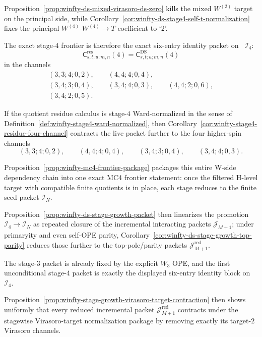 \begin{remark}
Proposition~\ref{prop:winfty-ds-mixed-virasoro-ds-zero} kills the mixed
$W^{(2)}$ target on the principal side, while
Corollary~\ref{cor:winfty-ds-stage4-self-t-normalization} fixes the
principal $W^{(4)}$-$W^{(4)}\to T$ coefficient to `2'.

The exact stage-$4$ frontier is therefore the exact six-entry identity
packet on
~$\mathcal{I}_4$:
\[
\mathsf{C}^{\mathrm{res}}_{s,t;u;m,n}(4)
=
\mathsf{C}^{\mathrm{DS}}_{s,t;u;m,n}(4)
\]
in the channels
\[
\begin{gathered}
(3,3;4;0,2),\qquad
(4,4;4;0,4),\\
(3,4;3;0,4),\qquad
(3,4;4;0,3),\qquad
(4,4;2;0,6),\\
(3,4;2;0,5).
\end{gathered}
\]

If the quotient residue calculus is stage-$4$ Ward-normalized in the
sense of Definition~\ref{def:winfty-stage4-ward-normalized}, then
Corollary~\ref{cor:winfty-stage4-residue-four-channel} contracts the
live packet further to the four higher-spin channels
\[
(3,3;4;0,2),\qquad
(4,4;4;0,4),\qquad
(3,4;3;0,4),\qquad
(3,4;4;0,3).
\]

Proposition~\ref{prop:winfty-mc4-frontier-package} packages this
entire W-side dependency chain into one exact MC4 frontier statement:
once the filtered H-level target with compatible finite quotients is in
place, each stage reduces to the finite seed packet
$\mathcal{I}_N$.

Proposition~\ref{prop:winfty-ds-stage-growth-packet} then
linearizes the promotion $\mathcal{I}_4\to \mathcal{I}_N$ as repeated
closure of the incremental interacting packets
$\mathcal{J}_{M+1}$; under primaryity and even self-OPE parity,
Corollary~\ref{cor:winfty-ds-stage-growth-top-parity} reduces those
further to the top-pole/parity packets
$\mathcal{J}_{M+1}^{\mathrm{red}}$.

The stage-$3$ packet is already fixed by the explicit $W_3$ OPE, and
the first unconditional stage-$4$ packet is exactly the displayed
six-entry identity block on~$\mathcal{I}_4$.

Proposition~\ref{prop:winfty-stage-growth-virasoro-target-contraction}
then shows uniformly that every reduced incremental packet
$\mathcal{J}_{M+1}^{\mathrm{red}}$ contracts under the stagewise
Virasoro-target normalization package by removing exactly its
target-$2$ Virasoro channels.


\end{remark}
